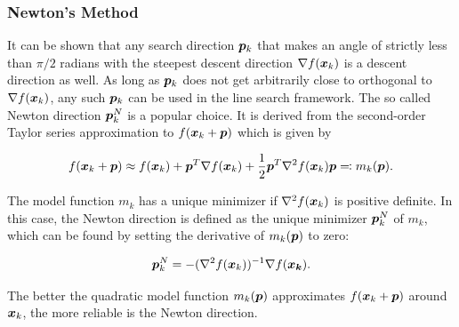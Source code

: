\subsubsection{Newton's Method}\label{sss:newton-method}
It can be shown that any search direction $\bm{p}_k$ that makes an angle of strictly less than $\pi/2$ radians with the steepest descent
direction $\nabla f(\bm{x}_k)$ is a descent direction as well. As long as $\bm{p}_k$ does not get arbitrarily close to 
orthogonal to $\nabla f(\bm{x}_k)$, any such $\bm{p}_k$ can be used in the line search framework. The so called Newton direction $\bm{p}^N_k$ 
is a popular choice. It is derived from the second-order Taylor series approximation to $f(\bm{x}_k + \bm{p})$ which is given by

\begin{equation}\label{eq:newton-model}
    f(\bm{x}_k + \bm{p}) \approx f(\bm{x}_k) + \bm{p}^T \nabla f(\bm{x}_k) + \frac{1}{2}\bm{p}^T \nabla^2 f(\bm{x}_k) \bm{p} \eqqcolon 
    m_k(\bm{p}).
\end{equation}

\noindent The model function $m_k$ has a unique minimizer if $\nabla^2 f(\bm{x}_k)$ is positive definite. In this case, the Newton direction 
is defined
as the unique minimizer $\bm{p}^N_k$ of $m_k$, which can be found by setting the derivative of $m_k(\bm{p})$ to zero:

\begin{equation}\label{eq:newton-diretion}
    \bm{p}^N_k = - (\nabla^2 f(\bm{x}_k))^{-1} \nabla f(\bm{x_k}).
\end{equation}

\noindent The better the quadratic model function $m_k(\bm{p})$ approximates $f(\bm{x}_k + \bm{p})$ around $\bm{x}_k$, the more reliable is the 
Newton direction. 

